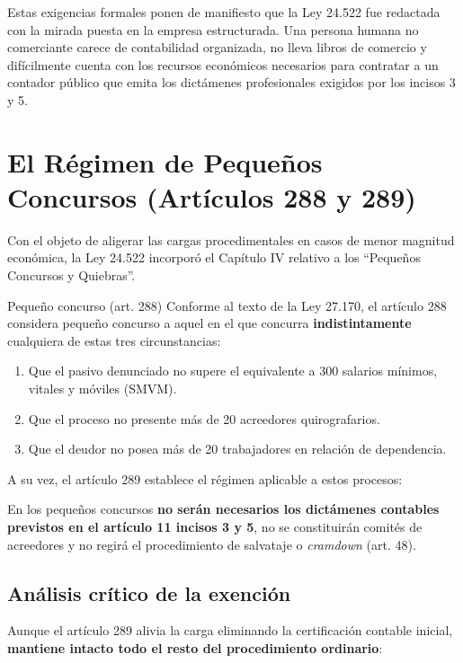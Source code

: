\documentclass[12pt,oneside]{book}
\begin{document}
Estas exigencias formales ponen de manifiesto que la Ley 24.522 fue redactada con la mirada puesta en la empresa estructurada. Una persona humana no comerciante carece de contabilidad organizada, no lleva libros de comercio y difícilmente cuenta con los recursos económicos necesarios para contratar a un contador público que emita los dictámenes profesionales exigidos por los incisos 3 y 5.

\section{El Régimen de Pequeños Concursos (Artículos 288 y 289)}

Con el objeto de aligerar las cargas procedimentales en casos de menor magnitud económica, la Ley 24.522 incorporó el Capítulo IV relativo a los ``Pequeños Concursos y Quiebras''.

\begin{definition}{Pequeño concurso (art. 288)}
Conforme al texto de la Ley 27.170, el artículo 288 considera pequeño concurso a aquel en el que concurra \textbf{indistintamente} cualquiera de estas tres circunstancias:
\begin{enumerate}
    \item Que el pasivo denunciado no supere el equivalente a 300 salarios mínimos, vitales y móviles (SMVM).
    \item Que el proceso no presente más de 20 acreedores quirografarios.
    \item Que el deudor no posea más de 20 trabajadores en relación de dependencia.
\end{enumerate}
\end{definition}

A su vez, el artículo 289 establece el régimen aplicable a estos procesos:

\begin{important}
En los pequeños concursos \textbf{no serán necesarios los dictámenes contables previstos en el artículo 11 incisos 3 y 5}, no se constituirán comités de acreedores y no regirá el procedimiento de salvataje o \textit{cramdown} (art. 48).
\end{important}

\subsection{Análisis crítico de la exención}

Aunque el artículo 289 alivia la carga eliminando la certificación contable inicial, \textbf{mantiene intacto todo el resto del procedimiento ordinario}:
\end{document}

